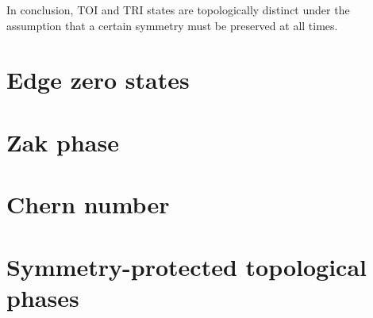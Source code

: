 In conclusion, TOI and TRI states are topologically distinct under the assumption that a certain symmetry must be preserved at all times.
%
%
\section{Edge zero states}
\label{sec:edge_zero_states}
%
%
%
%
\section{Zak phase}
\label{sec:zak_phase}
%
%
%
%
\section{Chern number}
\label{sec:chern_number}
%
%
%
%
\section{Symmetry-protected topological phases}
\label{sec:symmetry_protected_topological_phases}
%
%

